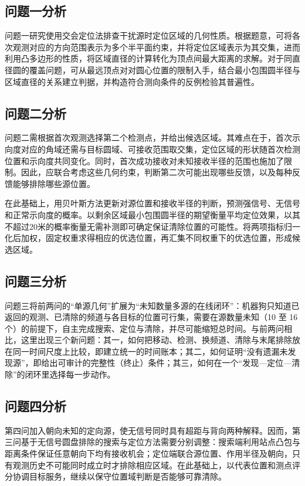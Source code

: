 \documentclass[UTF8,a4paper,zihao=-4,fontset=none]{ctexart}
\begin{document}
\subsection{问题一分析}

问题一研究使用交会定位法排查干扰源时定位区域的几何性质。根据题意，可将各次观测对应的方向范围表示为多个半平面约束，并将定位区域表示为其交集，进而利用凸多边形的性质，将区域直径的计算转化为顶点间最大距离的求解。对于同直径圆的覆盖问题，可从最远顶点对对圆心位置的限制入手，结合最小包围圆半径与区域直径的关系建立判据，并构造符合测向条件的反例检验其普遍性。

\subsection{问题二分析}

问题二需根据首次观测选择第二个检测点，并给出候选区域。其难点在于，首次示向度对应的角域还需与目标圆域、可接收范围取交集，定位区域的形状随首次检测位置和示向度共同变化。同时，首次成功接收对未知接收半径的范围也施加了限制。因此，应联合考虑这些几何约束，判断第二次可能出现哪些反馈，以及每种反馈能够排除哪些源位置。

在此基础上，用贝叶斯方法更新对源位置和接收半径的判断，预测强信号、无信号和正常示向度的概率。以剩余区域最小包围圆半径的期望衡量平均定位效果，以其不超过20米的概率衡量无需补测即可确定保证清除位置的可能性。将两项指标归一化后加权，固定权重求得相应的优选位置，再汇集不同权重下的优选位置，形成候选区域。

\subsection{问题三分析}

问题三将前两问的“单源几何”扩展为“未知数量多源的在线闭环”：机器狗只知道已返回的观测、已清除的频道与各目标的位置可行集，需要在源数量未知（10 至 16 个）的前提下，自主完成搜索、定位与清除，并尽可能缩短总时间。与前两问相比，这里出现三个新问题：其一，如何把移动、检测、换频道、清除与末尾排除放在同一时间尺度上比较，即建立统一的时间账本；其二，如何证明“没有遗漏未发现源”，即给出可审计的完整性（终止）条件；其三，如何在一个“发现—定位—清除”的闭环里选择每一步动作。

\subsection{问题四分析}

第四问加入朝向未知的定向源，使无信号同时具有超距与背向两种解释。因而，第三问基于无信号圆盘排除的搜索与定位方法需要分别调整：搜索端利用站点凸包与距离条件保证任意朝向下均有接收机会；定位端联合源位置、作用半径及朝向，只有观测历史不可能同时成立时才排除相应区域。在此基础上，以代表位置和测点评分协调目标服务，继续以保守位置域判断是否能够可靠清除。
\end{document}
